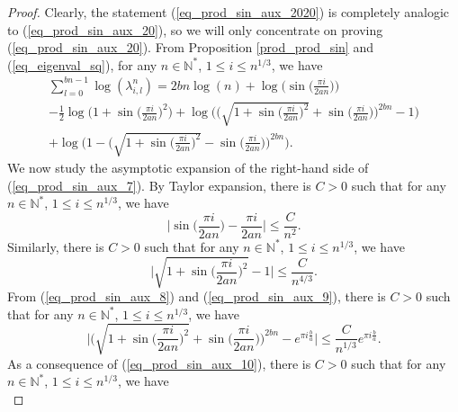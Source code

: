 \documentclass[10pt,a4paper]{amsart}
\newcommand{\nat}{\mathbb{N}}
\begin{document}
		\begin{proof}
			Clearly, the statement (\ref{eq_prod_sin_aux_2020}) is completely analogic to (\ref{eq_prod_sin_aux_20}), so we will only concentrate on proving (\ref{eq_prod_sin_aux_20}).
			From Proposition \ref{prod_prod_sin} and (\ref{eq_eigenval_sq}), for any $n \in \nat^*$, $1 \leq i \leq  n^{1/3}$,  we have
			\begin{multline}\label{eq_prod_sin_aux_7}
				\sum_{l = 0}^{bn - 1} 
				\log(\lambda_{i, l}^{n})
				=
				2 bn \log(n) 
				+
				\log \Big( \sin  \big( \frac{\pi i}{2 a n} \big) \Big) 
				\\
				- 
				\frac{1}{2} 
				\log \Big(
					1 + \sin  \big( \frac{\pi i}{2 a n} \big)^2
				\Big)
				+
				\log 
				\Big(
					\Big( \sqrt{ 1 + \sin  \big( \frac{\pi i}{2 a n} \big)^2} + \sin  \big( \frac{\pi i}{2 a n} \big)  \Big)^{2bn} - 1
				\Big)
				\\
				+
				\log 
				\Big(
					1 - \Big(  \sqrt{ 1 + \sin  \big( \frac{\pi i}{2 a n} \big)^2} - \sin  \big( \frac{\pi i}{2 a n} \big) \Big)^{2bn}
				\Big).
			\end{multline}
			We now study the asymptotic expansion of the right-hand side of (\ref{eq_prod_sin_aux_7}).
			By Taylor expansion, there is $C > 0$ such that for any $n \in \nat^*$, $1 \leq i \leq n^{1/3}$, we have
			\begin{equation}\label{eq_prod_sin_aux_8}
				\Big| \sin  \big( \frac{\pi i}{2 a n} \big) - \frac{\pi i}{2 a n} \Big| \leq \frac{C}{n^{2}}.
			\end{equation}
			Similarly, there is $C > 0$ such that for any $n \in \nat^*$, $1 \leq i \leq  n^{1/3}$, we have
			\begin{equation}\label{eq_prod_sin_aux_9}
				\Big| \sqrt{ 1 + \sin  \big( \frac{\pi i}{2 a n} \big)^2} - 1 \Big| \leq \frac{C}{n^{4/3}}.
			\end{equation}
			From (\ref{eq_prod_sin_aux_8}) and (\ref{eq_prod_sin_aux_9}), there is $C > 0$ such that for any $n \in \nat^*$, $1 \leq i \leq  n^{1/3}$, we have
			\begin{equation}\label{eq_prod_sin_aux_10}
				\bigg|
				\Big( \sqrt{ 1 + \sin  \big( \frac{\pi i}{2 a n} \big)^2} + \sin  \big( \frac{\pi i}{2 a n} \big) \Big)^{2bn}
				-
				e^{\pi i \frac{b}{a}}
				\bigg|
				\leq
				\frac{C}{n^{1/3}}e^{\pi i \frac{b}{a}}.
			\end{equation}
			As a consequence of (\ref{eq_prod_sin_aux_10}), there is $C > 0$ such that for any $n \in \nat^*$, $1 \leq i \leq  n^{1/3}$, we have
			\begin{equation}\label{eq_prod_sin_aux_11}

\end{equation}
\end{proof}
\end{document}
